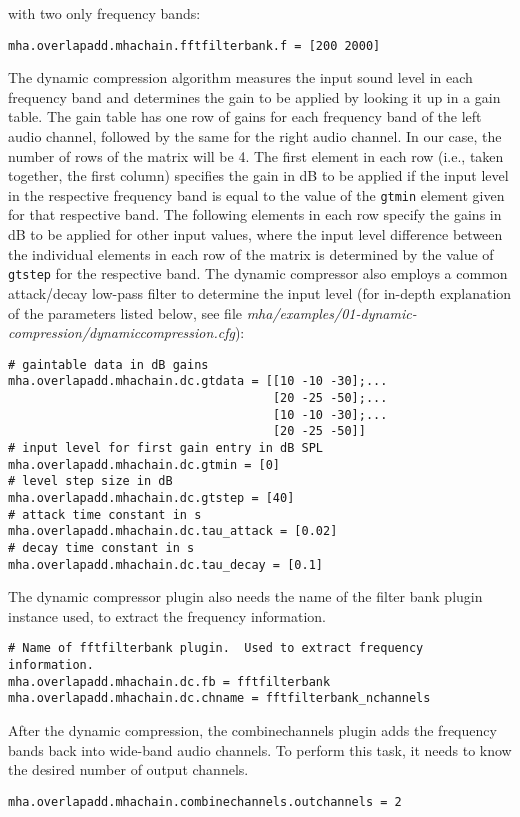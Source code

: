 with two only frequency bands:
\begin{verbatim}
mha.overlapadd.mhachain.fftfilterbank.f = [200 2000]
\end{verbatim}
%
The dynamic compression algorithm measures the input sound level in 
each frequency band and determines the gain to be applied by looking 
it up in a gain table. The gain table has one row of gains for each 
frequency band of the left audio channel, followed by the same for 
the right audio channel. In our case, the number of rows of the 
matrix will be 4.
%
The first element in each row (i.e., taken together, the first
column) specifies the gain in dB to be applied if the input level in
the respective frequency band is equal to the value of the \verb!gtmin!
element given for that respective band.
%
The following elements in each row specify the gains in dB to be
applied for other input values, where the input level difference
between the individual elements in each row of the matrix is
determined by the value of \verb!gtstep! for the respective 
band. The dynamic compressor also employs a common attack/decay low-pass filter
to determine the input level (for in-depth explanation of the parameters 
listed below, see file
\emph{mha/examples/01-dynamic-compression/dynamiccompression.cfg}):
\begin{verbatim}
# gaintable data in dB gains
mha.overlapadd.mhachain.dc.gtdata = [[10 -10 -30];...
                                     [20 -25 -50];...
                                     [10 -10 -30];...
                                     [20 -25 -50]]
# input level for first gain entry in dB SPL
mha.overlapadd.mhachain.dc.gtmin = [0]
# level step size in dB
mha.overlapadd.mhachain.dc.gtstep = [40]
# attack time constant in s
mha.overlapadd.mhachain.dc.tau_attack = [0.02]
# decay time constant in s
mha.overlapadd.mhachain.dc.tau_decay = [0.1]
\end{verbatim}
%
The dynamic compressor plugin also needs the name of the filter bank plugin
instance used, to extract the frequency information.
\begin{verbatim}
# Name of fftfilterbank plugin.  Used to extract frequency information.
mha.overlapadd.mhachain.dc.fb = fftfilterbank
mha.overlapadd.mhachain.dc.chname = fftfilterbank_nchannels
\end{verbatim}
%
After the dynamic compression, the combinechannels plugin adds the frequency
bands back into wide-band audio channels.
%
To perform this task, it needs to know the desired number of output
channels.
\begin{verbatim}
mha.overlapadd.mhachain.combinechannels.outchannels = 2
\end{verbatim}
